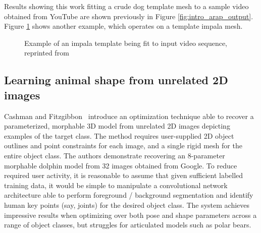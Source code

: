         Results showing this work fitting a crude dog template mesh to a sample video obtained from YouTube are shown previously in Figure \ref{fig:intro_arap_output}. Figure \ref{fig:arap_output} shows another example, which operates on a template impala mesh.

        \begin{figure}[H]
            \caption{Example of an impala template being fit to input video sequence, reprinted from~\cite{arap_stebbing}}
            \label{fig:arap_output}
        \end{figure}

    \subsection{Learning animal shape from unrelated 2D images}
        Cashman and Fitzgibbon~\cite{cashman2013shape} introduce an optimization technique able to recover a parameterized, morphable 3D model from unrelated 2D images depicting examples of the target class. The method requires user-supplied 2D object outlines and point constraints for each image, and a single rigid mesh for the entire object class. The authors demonstrate recovering an 8-parameter morphable dolphin model from 32 images obtained from Google. To reduce required user activity, it is reasonable to assume that given sufficient labelled training data, it would be simple to manipulate a convolutional network architecture able to perform foreground / background segmentation and identify human key points (say, joints) for the desired object class. The system achieves impressive results when optimizing over both pose and shape parameters across a range of object classes, but struggles for articulated models such as polar bears.

